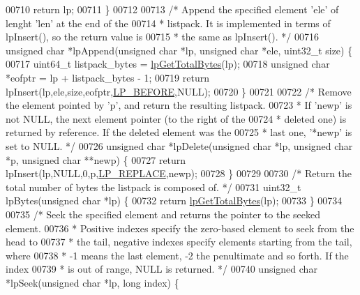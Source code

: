\begin{DoxyCode}
{00710     \textcolor{keywordflow}{return} lp;
00711 \}
00712 
00713 \textcolor{comment}{/* Append the specified element 'ele' of lenght 'len' at the end of the}
00714 \textcolor{comment}{ * listpack. It is implemented in terms of lpInsert(), so the return value is}
00715 \textcolor{comment}{ * the same as lpInsert(). */}
00716 \textcolor{keywordtype}{unsigned} \textcolor{keywordtype}{char} *lpAppend(\textcolor{keywordtype}{unsigned} \textcolor{keywordtype}{char} *lp, \textcolor{keywordtype}{unsigned} \textcolor{keywordtype}{char} *ele, uint32\_t size) \{
00717     uint64\_t listpack\_bytes = \hyperlink{listpack_8c_a18d79dc11f1002b8c367eab243912a36}{lpGetTotalBytes}(lp);
00718     \textcolor{keywordtype}{unsigned} \textcolor{keywordtype}{char} *eofptr = lp + listpack\_bytes - 1;
00719     \textcolor{keywordflow}{return} lpInsert(lp,ele,size,eofptr,\hyperlink{listpack_8h_a64de9ded0fe5ccb80bc2bc9fb8c6c3b2}{LP\_BEFORE},NULL);
00720 \}
00721 
00722 \textcolor{comment}{/* Remove the element pointed by 'p', and return the resulting listpack.}
00723 \textcolor{comment}{ * If 'newp' is not NULL, the next element pointer (to the right of the}
00724 \textcolor{comment}{ * deleted one) is returned by reference. If the deleted element was the}
00725 \textcolor{comment}{ * last one, '*newp' is set to NULL. */}
00726 \textcolor{keywordtype}{unsigned} \textcolor{keywordtype}{char} *lpDelete(\textcolor{keywordtype}{unsigned} \textcolor{keywordtype}{char} *lp, \textcolor{keywordtype}{unsigned} \textcolor{keywordtype}{char} *p, \textcolor{keywordtype}{unsigned} \textcolor{keywordtype}{char} **newp) \{
00727     \textcolor{keywordflow}{return} lpInsert(lp,NULL,0,p,\hyperlink{listpack_8h_a29d3b9a55d47053582a5025dd85d7fe6}{LP\_REPLACE},newp);
00728 \}
00729 
00730 \textcolor{comment}{/* Return the total number of bytes the listpack is composed of. */}
00731 uint32\_t lpBytes(\textcolor{keywordtype}{unsigned} \textcolor{keywordtype}{char} *lp) \{
00732     \textcolor{keywordflow}{return} \hyperlink{listpack_8c_a18d79dc11f1002b8c367eab243912a36}{lpGetTotalBytes}(lp);
00733 \}
00734 
00735 \textcolor{comment}{/* Seek the specified element and returns the pointer to the seeked element.}
00736 \textcolor{comment}{ * Positive indexes specify the zero-based element to seek from the head to}
00737 \textcolor{comment}{ * the tail, negative indexes specify elements starting from the tail, where}
00738 \textcolor{comment}{ * -1 means the last element, -2 the penultimate and so forth. If the index}
00739 \textcolor{comment}{ * is out of range, NULL is returned. */}
00740 \textcolor{keywordtype}{unsigned} \textcolor{keywordtype}{char} *lpSeek(\textcolor{keywordtype}{unsigned} \textcolor{keywordtype}{char} *lp, \textcolor{keywordtype}{long} index) \{
}
\end{DoxyCode}
